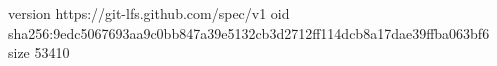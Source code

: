 version https://git-lfs.github.com/spec/v1
oid sha256:9edc5067693aa9c0bb847a39e5132cb3d2712ff114dcb8a17dae39ffba063bf6
size 53410
